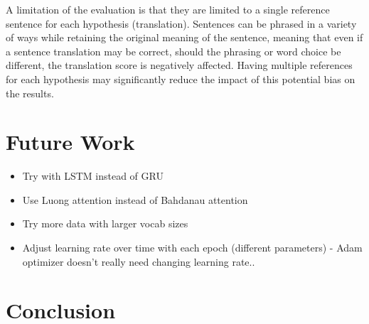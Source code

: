 A limitation of the evaluation is that they are limited to a single reference sentence for each hypothesis (translation). Sentences can be phrased in a variety of ways while retaining the original meaning of the sentence, meaning that even if a sentence translation may be correct, should the phrasing or word choice be different, the translation score is negatively affected. Having multiple references for each hypothesis may significantly reduce the impact of this potential bias on the results.



\section{Future Work}

\begin{itemize}
    \item Try with LSTM instead of GRU
    \item Use Luong \cite{luong_effective_2015} attention instead of Bahdanau \cite{bahdanau_neural_2016} attention
    \item Try more data with larger vocab sizes
    \item Adjust learning rate over time with each epoch (different parameters) - Adam optimizer doesn't really need changing learning rate..
\end{itemize}


\section{Conclusion}